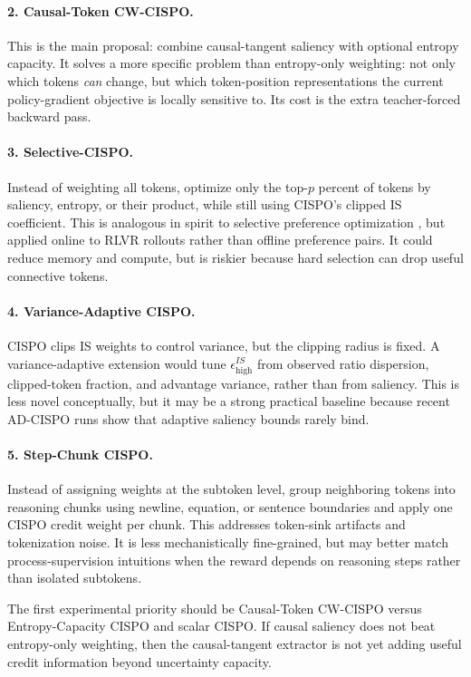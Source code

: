 \documentclass[11pt]{article}
\begin{document}
\paragraph{2. Causal-Token CW-CISPO.}
This is the main proposal: combine causal-tangent saliency with optional entropy
capacity. It solves a more specific problem than entropy-only weighting: not
only which tokens \emph{can} change, but which token-position representations
the current policy-gradient objective is locally sensitive to. Its cost is the
extra teacher-forced backward pass.

\paragraph{3. Selective-CISPO.}
Instead of weighting all tokens, optimize only the top-$p$ percent of tokens by
saliency, entropy, or their product, while still using CISPO's clipped IS
coefficient. This is analogous in spirit to selective preference optimization
\cite{yang2025sepo}, but applied online to RLVR rollouts rather than offline
preference pairs. It could reduce memory and compute, but is riskier because
hard selection can drop useful connective tokens.

\paragraph{4. Variance-Adaptive CISPO.}
CISPO clips IS weights to control variance, but the clipping radius is fixed.
A variance-adaptive extension would tune $\epsilon^{IS}_{\mathrm{high}}$ from
observed ratio dispersion, clipped-token fraction, and advantage variance,
rather than from saliency. This is less novel conceptually, but it may be a
strong practical baseline because recent AD-CISPO runs show that adaptive
saliency bounds rarely bind.

\paragraph{5. Step-Chunk CISPO.}
Instead of assigning weights at the subtoken level, group neighboring tokens
into reasoning chunks using newline, equation, or sentence boundaries and apply
one CISPO credit weight per chunk. This addresses token-sink artifacts and
tokenization noise. It is less mechanistically fine-grained, but may better
match process-supervision intuitions when the reward depends on reasoning
steps rather than isolated subtokens.

The first experimental priority should be Causal-Token CW-CISPO versus
Entropy-Capacity CISPO and scalar CISPO. If causal saliency does not beat
entropy-only weighting, then the causal-tangent extractor is not yet adding
useful credit information beyond uncertainty capacity.
\end{document}

